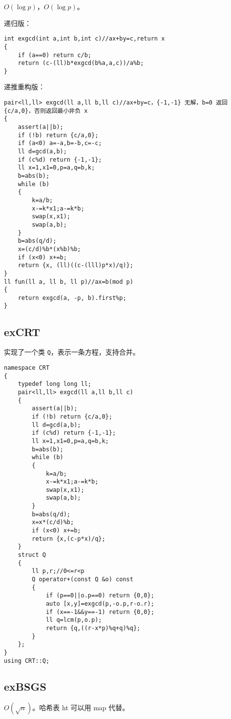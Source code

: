 \documentclass[12pt]{ctexart}
\begin{document}
$O(\log p)$，$O(\log p)$。

递归版：

\begin{lstlisting}
int exgcd(int a,int b,int c)//ax+by=c,return x
{
	if (a==0) return c/b;
	return (c-(ll)b*exgcd(b%a,a,c))/a%b;
}
\end{lstlisting}

递推重构版：

\begin{lstlisting}
pair<ll,ll> exgcd(ll a,ll b,ll c)//ax+by=c，{-1,-1} 无解，b=0 返回 {c/a,0}，否则返回最小非负 x
{
	assert(a||b);
	if (!b) return {c/a,0};
	if (a<0) a=-a,b=-b,c=-c;
	ll d=gcd(a,b);
	if (c%d) return {-1,-1};
	ll x=1,x1=0,p=a,q=b,k;
	b=abs(b);
	while (b)
	{
		k=a/b;
		x-=k*x1;a-=k*b;
		swap(x,x1);
		swap(a,b);
	}
	b=abs(q/d);
	x=(c/d)%b*(x%b)%b;
	if (x<0) x+=b;
	return {x, (ll)((c-(lll)p*x)/q)};
}
ll fun(ll a, ll b, ll p)//ax=b(mod p)
{
	return exgcd(a, -p, b).first%p;
}
\end{lstlisting}

\subsection{exCRT}

实现了一个类 \verb|Q|，表示一条方程，支持合并。

\begin{lstlisting}
namespace CRT
{
	typedef long long ll;
	pair<ll,ll> exgcd(ll a,ll b,ll c)
	{
		assert(a||b);
		if (!b) return {c/a,0};
		ll d=gcd(a,b);
		if (c%d) return {-1,-1};
		ll x=1,x1=0,p=a,q=b,k;
		b=abs(b);
		while (b)
		{
			k=a/b;
			x-=k*x1;a-=k*b;
			swap(x,x1);
			swap(a,b);
		}
		b=abs(q/d);
		x=x*(c/d)%b;
		if (x<0) x+=b;
		return {x,(c-p*x)/q};
	}
	struct Q
	{
		ll p,r;//0<=r<p
		Q operator+(const Q &o) const
		{
			if (p==0||o.p==0) return {0,0};
			auto [x,y]=exgcd(p,-o.p,r-o.r);
			if (x==-1&&y==-1) return {0,0};
			ll q=lcm(p,o.p);
			return {q,((r-x*p)%q+q)%q};
		}
	};
}
using CRT::Q;
\end{lstlisting}


\subsection{exBSGS}

$O(\sqrt n)$。哈希表 ht 可以用 map 代替。
\end{document}
